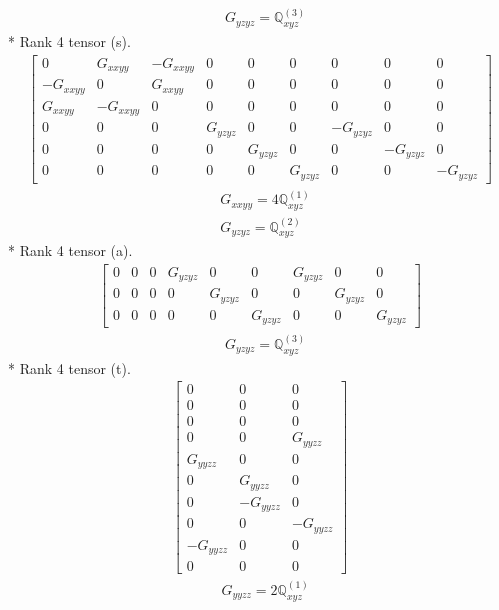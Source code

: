\documentclass[fleqn,8pt,landscape]{jsarticle}
\begin{document}
\begin{align*}
& G_{yzyz} = \mathbb{Q}_{xyz}^{(3)}
\end{align*}
* Rank 4 tensor (s).
\begin{align*}
\begin{bmatrix} 0 & G_{xxyy} & - G_{xxyy} & 0 & 0 & 0 & 0 & 0 & 0 \\ - G_{xxyy} & 0 & G_{xxyy} & 0 & 0 & 0 & 0 & 0 & 0 \\ G_{xxyy} & - G_{xxyy} & 0 & 0 & 0 & 0 & 0 & 0 & 0 \\ 0 & 0 & 0 & G_{yzyz} & 0 & 0 & - G_{yzyz} & 0 & 0 \\ 0 & 0 & 0 & 0 & G_{yzyz} & 0 & 0 & - G_{yzyz} & 0 \\ 0 & 0 & 0 & 0 & 0 & G_{yzyz} & 0 & 0 & - G_{yzyz} \end{bmatrix}
\end{align*}
\begin{align*}
& G_{xxyy} = 4 \mathbb{Q}_{xyz}^{(1)} \\
& G_{yzyz} = \mathbb{Q}_{xyz}^{(2)}
\end{align*}
* Rank 4 tensor (a).
\begin{align*}
\begin{bmatrix} 0 & 0 & 0 & G_{yzyz} & 0 & 0 & G_{yzyz} & 0 & 0 \\ 0 & 0 & 0 & 0 & G_{yzyz} & 0 & 0 & G_{yzyz} & 0 \\ 0 & 0 & 0 & 0 & 0 & G_{yzyz} & 0 & 0 & G_{yzyz} \end{bmatrix}
\end{align*}
\begin{align*}
& G_{yzyz} = \mathbb{Q}_{xyz}^{(3)}
\end{align*}
* Rank 4 tensor (t).
\begin{align*}
\begin{bmatrix} 0 & 0 & 0 \\ 0 & 0 & 0 \\ 0 & 0 & 0 \\ 0 & 0 & G_{yyzz} \\ G_{yyzz} & 0 & 0 \\ 0 & G_{yyzz} & 0 \\ 0 & - G_{yyzz} & 0 \\ 0 & 0 & - G_{yyzz} \\ - G_{yyzz} & 0 & 0 \\ 0 & 0 & 0 \end{bmatrix}
\end{align*}
\begin{align*}
& G_{yyzz} = 2 \mathbb{Q}_{xyz}^{(1)}
\end{align*}
\end{document}
